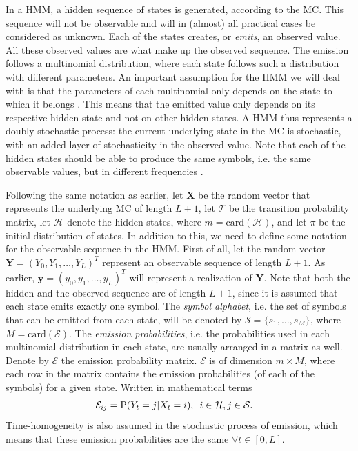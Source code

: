 \documentclass{article}
\begin{document}
In a HMM, a hidden sequence of states is generated, according to the MC. This sequence will not be observable and will in (almost) all practical cases be considered as unknown. Each of the states creates, or \textit{emits}, an observed value. All these observed values are what make up the observed sequence. The emission follows a multinomial distribution, where each state follows such a distribution with different parameters. An important assumption for the HMM we will deal with is that the parameters of each multinomial only depends on the state to which it belongs \cite{Choo2004}. This means that the emitted value only depends on its respective hidden state and not on other hidden states. A HMM thus represents a doubly stochastic process: the current underlying state in the MC is stochastic, with an added layer of stochasticity in the observed value. Note that each of the hidden states should be able to produce the same symbols, i.e. the same observable values, but in different frequencies \cite{Christianini2006}.

Following the same notation as earlier, let $\mathbf{X}$ be the random vector that represents the underlying MC of length $L+1$, let $\mathcal{T}$ be the transition probability matrix, let $\mathcal{H}$ denote the hidden states, where $m = \text{card}(\mathcal{H})$, and let $\pi$ be the initial distribution of states. In addition to this, we need to define some notation for the observable sequence in the HMM. First of all, let the random vector $\mathbf{Y} = (Y_0, Y_1, \ldots, Y_L)^T$ represent an observable sequence of length $L+1$. As earlier, $\mathbf{y} = (y_0, y_1, \ldots, y_L)^T$ will represent a realization of $\mathbf{Y}$. Note that both the hidden and the observed sequence are of length $L+1$, since it is assumed that each state emits exactly one symbol. The \textit{symbol alphabet}, i.e. the set of symbols that can be emitted from each state, will be denoted by $\mathcal{S} = \{s_1, \ldots, s_M\}$, where $M = \text{card}(\mathcal{S})$. The \textit{emission probabilities}, i.e. the probabilities used in each multinomial distribution in each state, are usually arranged in a matrix as well. Denote by $\mathcal{E}$ the emission probability matrix. $\mathcal{E}$ is of dimension $m \times M$, where each row in the matrix contains the emission probabilities (of each of the symbols) for a given state. Written in mathematical terms 
\begin{align*}
    \mathcal{E}_{ij} &= \text{P}(Y_t = j|X_t = i), \hspace{0.5em} i \in \mathcal{H}, j \in \mathcal{S}.
\end{align*}
Time-homogeneity is also assumed in the stochastic process of emission, which means that these emission probabilities are the same $\forall t \in [0, L]$. 
\end{document}
